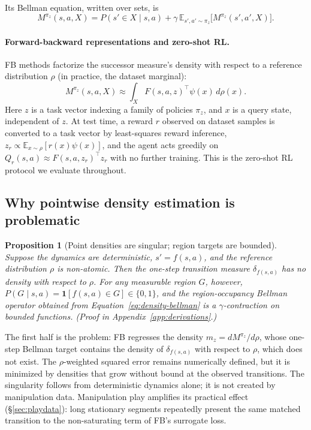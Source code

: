 \documentclass{article}
\newcommand{\E}{\mathbb{E}}
\newcommand{\ind}[1]{\mathbf{1}\!\left[#1\right]}
\newtheorem{proposition}{Proposition}
\begin{document}
Its Bellman equation, written over sets, is
\begin{equation}
\label{eq:density-bellman}
M^{\pi_z}(s,a,X) = P(s'\in X\mid s,a)+\gamma\,\E_{s',a'\sim\pi_z}\big[M^{\pi_z}(s',a',X)\big].
\end{equation}

\paragraph{Forward-backward representations and zero-shot RL.}
FB methods \citep{touati2021learning,touati2023does} factorize the successor measure's density with respect to a reference distribution $\rho$ (in practice, the dataset marginal):
\begin{equation}
\label{eq:fb}
M^{\pi_z}(s,a,X) \approx \int_X F(s,a,z)^{\top}\psi(x)\,d\rho(x).
\end{equation}
Here $z$ is a task vector indexing a family of policies $\pi_z$, and $x$ is a query state, independent of $z$.
At test time, a reward $r$ observed on dataset samples is converted to a task vector by least-squares reward inference, $z_r \propto \E_{x\sim\rho}[r(x)\psi(x)]$, and the agent acts greedily on $Q_r(s,a)\approx F(s,a,z_r)^{\top}z_r$ with no further training.
This is the zero-shot RL protocol we evaluate throughout.

\subsection{Why pointwise density estimation is problematic}
\label{sec:failure}

\begin{proposition}[Point densities are singular; region targets are bounded]
\label{prop:fixed-points}
Suppose the dynamics are deterministic, $s'=f(s,a)$, and the reference distribution $\rho$ is non-atomic.
Then the one-step transition measure $\delta_{f(s,a)}$ has no density with respect to $\rho$.
For any measurable region $G$, however, $P(G\mid s,a)=\ind{f(s,a)\in G}\in\{0,1\}$, and the region-occupancy Bellman operator obtained from Equation~\ref{eq:density-bellman} is a $\gamma$-contraction on bounded functions.
(Proof in Appendix~\ref{app:derivations}.)
\end{proposition}

The first half is the problem: FB regresses the density $m_z=dM^{\pi_z}/d\rho$, whose one-step Bellman target contains the density of $\delta_{f(s,a)}$ with respect to $\rho$, which does not exist.
The $\rho$-weighted squared error remains numerically defined, but it is minimized by densities that grow without bound at the observed transitions.
The singularity follows from deterministic dynamics alone; it is not created by manipulation data.
Manipulation play amplifies its practical effect (\S\ref{sec:playdata}): long stationary segments repeatedly present the same matched transition to the non-saturating term of FB's surrogate loss.
\end{document}
